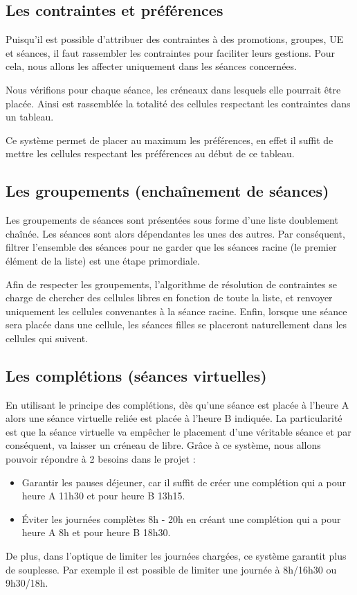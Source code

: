 \documentclass[12pt,a4paper,openany]{memoir}
\begin{document}
\subsection{Les contraintes et préférences}
\par 
Puisqu'il est possible d'attribuer des contraintes à des promotions, groupes, UE et séances, il faut rassembler les contraintes pour faciliter leurs gestions. Pour cela, nous allons les affecter uniquement dans les séances concernées. \par
Nous vérifions pour chaque séance, les créneaux dans lesquels elle pourrait être placée. Ainsi est rassemblée la totalité des cellules respectant les contraintes dans un tableau. \par
Ce système permet de placer au maximum les préférences, en effet il suffit de mettre les cellules respectant les préférences au début de ce tableau.

\subsection{Les groupements (enchaînement de séances)}
\par
Les groupements de séances sont présentées sous forme d'une liste doublement chaînée. Les séances sont alors dépendantes les unes des autres. Par conséquent, filtrer l'ensemble des séances pour ne garder que les séances racine (le premier élément de la liste) est une étape primordiale.
\par
Afin de respecter les groupements, l'algorithme de résolution de contraintes se charge de chercher des cellules libres en fonction de toute la liste, et renvoyer uniquement les cellules convenantes à la séance racine. Enfin, lorsque une séance sera placée dans une cellule, les séances filles se placeront naturellement dans les cellules qui suivent.

\subsection{Les complétions (séances virtuelles)}
\par
En utilisant le principe des complétions, dès qu'une séance est placée à l'heure A alors une séance virtuelle reliée est placée à l'heure B indiquée. La particularité est que la séance virtuelle va empêcher le placement d'une véritable séance et par conséquent, va laisser un créneau de libre. Grâce à ce système, nous allons pouvoir répondre à 2 besoins dans le projet : 
\begin{itemize}
    \item Garantir les pauses déjeuner, car il suffit de créer une complétion qui a pour heure A 11h30 et pour heure B 13h15.
    \item Éviter les journées complètes 8h - 20h en créant une complétion qui a pour heure A 8h et pour heure B 18h30.
\end{itemize}
\par
De plus, dans l'optique de limiter les journées chargées, ce système garantit plus de souplesse. Par exemple il est possible de limiter une journée à 8h/16h30 ou 9h30/18h.
\end{document}
